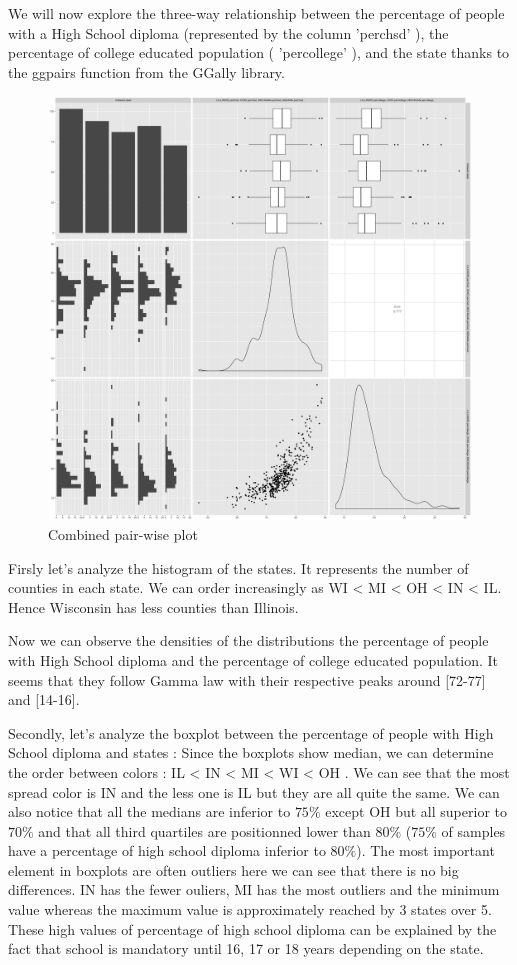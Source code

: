 \documentclass{article}
\begin{document}
We will now explore the three-way relationship between the percentage of
people with a High School diploma (represented by the column 'perchsd' ), the
percentage of college educated population ( 'percollege' ), and the state thanks to the ggpairs function from the GGally library.

\begin{figure}[!ht]
\centering
\includegraphics[width=1\textwidth]{pairplot_question2.png}
 \caption{Combined pair-wise plot}
\label{question2}
\end{figure}

Firsly let's analyze the histogram of the states. It represents the number of counties in each state. We can order increasingly as WI < MI < OH < IN < IL. Hence Wisconsin has less counties than Illinois.

Now we can observe the densities of the distributions the percentage of people with High School diploma and the percentage of college educated population. It seems that they follow Gamma law with their respective peaks around [72-77] and [14-16].

Secondly, let's analyze the boxplot between the percentage of people with High School diploma and states : 
Since the boxplots show median, we can determine the order between colors :
IL < IN < MI < WI < OH . We can see that the most spread color is IN and the less one is IL but they are all quite the same. We can also notice that all the medians are inferior to $75\%$ except OH but all superior to $70\%$  and that all third quartiles are positionned lower than $80\%$ ($75\%$ of samples have a percentage of high school diploma inferior to $80\%$). The most important element in boxplots are often outliers here we can see that there is no big differences. IN has the fewer ouliers, MI has the most outliers and the minimum value whereas the maximum value is approximately reached by 3 states over 5. These high values of percentage of high school diploma can be explained by the fact that school is mandatory until 16, 17 or 18 years depending on the state.
\end{document}
